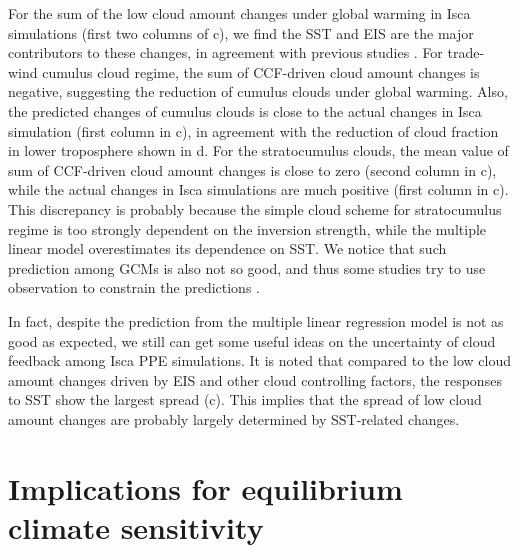 For the sum of the low cloud amount changes under global warming in Isca simulations (first two columns of c), we find the SST and EIS are the major contributors to these changes, in agreement with previous studies \citep{Myers2015relationships,Myers2016,Qu2015positive,Seethala2015,Zhou2015,McCoy2016relationships}. For trade-wind cumulus cloud regime, the sum of CCF-driven cloud amount changes is negative, suggesting the reduction of cumulus clouds under global warming. Also, the predicted changes of cumulus clouds is close to the actual changes in Isca simulation (first column in c), in agreement with the reduction of cloud fraction in lower troposphere shown in d. For the stratocumulus clouds, the mean value of sum of CCF-driven cloud amount changes is close to zero (second column in c), while the actual changes in Isca simulations are much positive (first column in c). This discrepancy is probably because the simple cloud scheme for stratocumulus regime is too strongly dependent on the inversion strength, while the multiple linear model overestimates its dependence on SST. We notice that such prediction among GCMs is also not so good, and thus some studies try to use observation to constrain the predictions \citep{Myers2016,Myers2021}. 

In fact, despite the prediction from the multiple linear regression model is not as good as expected, we still can get some useful ideas on the uncertainty of cloud feedback among Isca PPE simulations. It is noted that compared to the low cloud amount changes driven by EIS and other cloud controlling factors, the responses to SST show the largest spread (c). This implies that the spread of low cloud amount changes are probably largely determined by SST-related changes. %

\section{Implications for equilibrium climate sensitivity}
\label{sec:implification_for_ECS}


